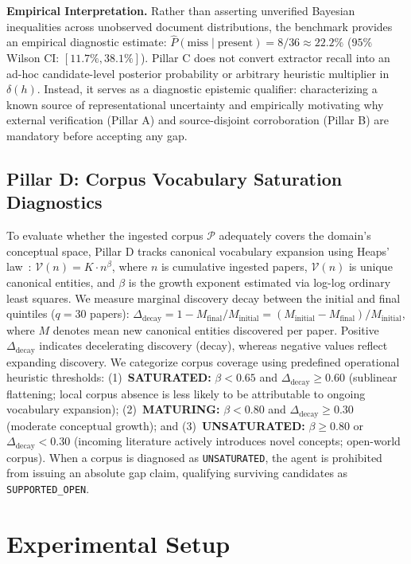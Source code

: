 \documentclass[runningheads]{llncs}
\begin{document}
\noindent\textbf{Empirical Interpretation.} Rather than asserting unverified Bayesian inequalities across unobserved document distributions, the benchmark provides an empirical diagnostic estimate: $\hat{P}(\text{miss} \mid \text{present}) = 8/36 \approx 22.2\%$ ($95\%$ Wilson CI: $[11.7\%, 38.1\%]$). Pillar C does not convert extractor recall into an ad-hoc candidate-level posterior probability or arbitrary heuristic multiplier in $\delta(h)$. Instead, it serves as a diagnostic epistemic qualifier: characterizing a known source of representational uncertainty and empirically motivating why external verification (Pillar A) and source-disjoint corroboration (Pillar B) are mandatory before accepting any gap.

\subsection{Pillar D: Corpus Vocabulary Saturation Diagnostics}
To evaluate whether the ingested corpus $\mathcal{P}$ adequately covers the domain's conceptual space, Pillar D tracks canonical vocabulary expansion using Heaps' law~\cite{heaps1978}: $\mathcal{V}(n) = K \cdot n^\beta$, where $n$ is cumulative ingested papers, $\mathcal{V}(n)$ is unique canonical entities, and $\beta$ is the growth exponent estimated via log-log ordinary least squares. We measure marginal discovery decay between the initial and final quintiles ($q = 30$ papers): $\Delta_{\text{decay}} = 1 - M_{\text{final}} / M_{\text{initial}} = (M_{\text{initial}} - M_{\text{final}}) / M_{\text{initial}}$, where $M$ denotes mean new canonical entities discovered per paper. Positive $\Delta_{\text{decay}}$ indicates decelerating discovery (decay), whereas negative values reflect expanding discovery. We categorize corpus coverage using predefined operational heuristic thresholds: (1)~\textbf{SATURATED:} $\beta < 0.65$ and $\Delta_{\text{decay}} \ge 0.60$ (sublinear flattening; local corpus absence is less likely to be attributable to ongoing vocabulary expansion); (2)~\textbf{MATURING:} $\beta < 0.80$ and $\Delta_{\text{decay}} \ge 0.30$ (moderate conceptual growth); and (3)~\textbf{UNSATURATED:} $\beta \ge 0.80$ or $\Delta_{\text{decay}} < 0.30$ (incoming literature actively introduces novel concepts; open-world corpus). When a corpus is diagnosed as \texttt{UNSATURATED}, the agent is prohibited from issuing an absolute gap claim, qualifying surviving candidates as \texttt{SUPPORTED\_OPEN}.

\section{Experimental Setup}
\label{sec:setup}
\end{document}
